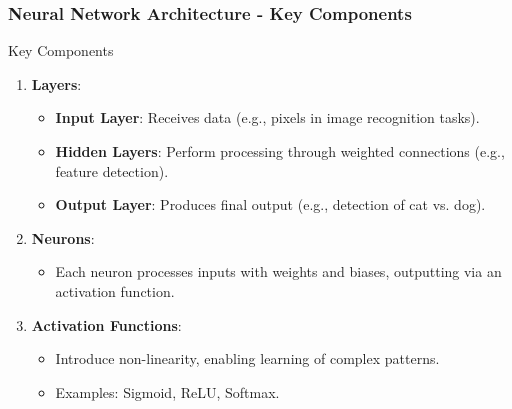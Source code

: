 \documentclass[aspectratio=169]{beamer}
\begin{document}
\begin{frame}[fragile]
    \frametitle{Neural Network Architecture - Key Components}
    \begin{block}{Key Components}
        \begin{enumerate}
            \item \textbf{Layers}:
                \begin{itemize}
                    \item \textbf{Input Layer}: Receives data (e.g., pixels in image recognition tasks).
                    \item \textbf{Hidden Layers}: Perform processing through weighted connections (e.g., feature detection).
                    \item \textbf{Output Layer}: Produces final output (e.g., detection of cat vs. dog).
                \end{itemize}
            \item \textbf{Neurons}:
                \begin{itemize}
                    \item Each neuron processes inputs with weights and biases, outputting via an activation function.
                \end{itemize}
            \item \textbf{Activation Functions}:
                \begin{itemize}
                    \item Introduce non-linearity, enabling learning of complex patterns.
                    \item Examples: Sigmoid, ReLU, Softmax.
                \end{itemize}
        \end{enumerate}
    \end{block}
\end{frame}
\end{document}
